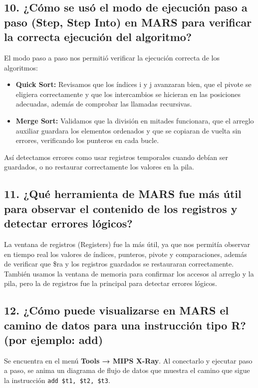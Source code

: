 \documentclass[12pt]{article}
\begin{document}
\subsection*{10. ¿Cómo se usó el modo de ejecución paso a paso (Step, Step Into) en MARS para verificar la correcta ejecución del algoritmo?}

El modo paso a paso nos permitió verificar la ejecución correcta de los algoritmos:

\begin{itemize}
    \item \textbf{Quick Sort:} Revisamos que los índices i y j avanzaran bien, que el pivote se eligiera correctamente y que los intercambios se hicieran en las posiciones adecuadas, además de comprobar las llamadas recursivas.
    \item \textbf{Merge Sort:} Validamos que la división en mitades funcionara, que el arreglo auxiliar guardara los elementos ordenados y que se copiaran de vuelta sin errores, verificando los punteros en cada bucle.
\end{itemize}

Así detectamos errores como usar registros temporales cuando debían ser guardados, o no restaurar correctamente los valores en la pila.

\subsection*{11. ¿Qué herramienta de MARS fue más útil para observar el contenido de los registros y detectar errores lógicos?}

La ventana de registros (Registers) fue la más útil, ya que nos permitía observar en tiempo real los valores de índices, punteros, pivote y comparaciones, además de verificar que \$ra y los registros guardados se restauraran correctamente. También usamos la ventana de memoria para confirmar los accesos al arreglo y la pila, pero la de registros fue la principal para detectar errores lógicos.

\subsection*{12. ¿Cómo puede visualizarse en MARS el camino de datos para una instrucción tipo R? (por ejemplo: add)}

Se encuentra en el menú \textbf{Tools → MIPS X-Ray}. Al conectarlo y ejecutar paso a paso, se anima un diagrama de flujo de datos que muestra el camino que sigue la instrucción \texttt{add \$t1, \$t2, \$t3}.
\end{document}
